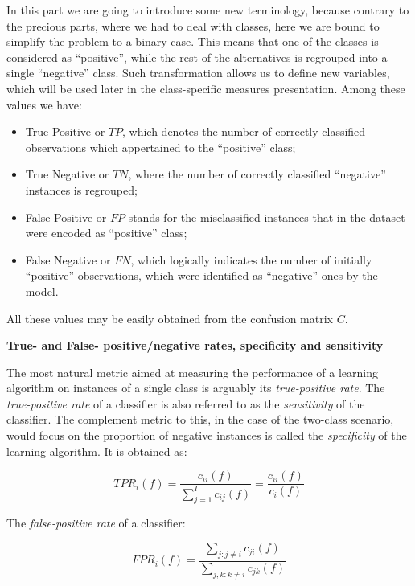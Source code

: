 \documentclass[11pt,]{article}
\providecommand{\tightlist}{%
  \setlength{\itemsep}{0pt}\setlength{\parskip}{0pt}}
\begin{document}
In this part we are going to introduce some new terminology, because
contrary to the precious parts, where we had to deal with classes, here
we are bound to simplify the problem to a binary case. This means that
one of the classes is considered as ``positive'', while the rest of the
alternatives is regrouped into a single ``negative'' class. Such
transformation allows us to define new variables, which will be used
later in the class-specific measures presentation. Among these values we
have:

\begin{itemize}
\tightlist
\item
  True Positive or \(TP\), which denotes the number of correctly
  classified observations which appertained to the ``positive'' class;
\item
  True Negative or \(TN\), where the number of correctly classified
  ``negative'' instances is regrouped;
\item
  False Positive or \(FP\) stands for the misclassified instances that
  in the dataset were encoded as ``positive'' class;
\item
  False Negative or \(FN\), which logically indicates the number of
  initially ``positive'' observations, which were identified as
  ``negative'' ones by the model.
\end{itemize}

All these values may be easily obtained from the confusion matrix \(C\).

\textbf{True- and False- positive/negative rates, specificity and
sensitivity}

The most natural metric aimed at measuring the performance of a learning
algorithm on instances of a single class is arguably its
\emph{true-positive rate}. The \emph{true-positive rate} of a classifier
is also referred to as the \emph{sensitivity} of the classifier. The
complement metric to this, in the case of the two-class scenario, would
focus on the proportion of negative instances is called the
\emph{specificity} of the learning algorithm. It is obtained as:

\begin{equation}
TPR_i (f) = \frac{c_{ii} (f)}{\sum_{j = 1}^{I} c_{ij} (f)} =
  \frac{c_{ii} (f)}{c_i (f)}
  \end{equation}

The \emph{false-positive rate} of a classifier:

\begin{equation}
FPR_i (f) = \frac{\sum_{j: j \neq i} c_{ji} (f)}
  {\sum_{j, k: k \neq i} c_{jk} (f)}
  \end{equation}
\end{document}
